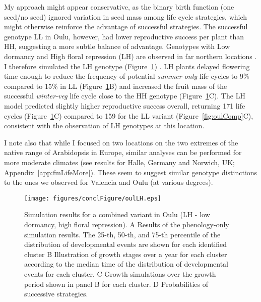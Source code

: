 My approach might appear conservative, as the binary birth function (one seed/no
seed) ignored variation in seed mass among life cycle strategies, which might
otherwise reinforce the advantage of successful strategies. The successful
genotype LL in Oulu, however, had lower reproductive success per plant than HH,
suggesting a more subtle balance of advantage. Genotypes with Low dormancy and
High floral repression (LH) are observed in far northern locations
\citep{atwell_genome-wide_2010}. I therefore simulated the LH genotype
(Figure~\ref{fig:oulLH}) . LH plants delayed flowering time enough to reduce the
frequency of potential \emph{summer-only} life cycles to 9\% compared to 15\% in
LL (Figure~\ref{fig:oulLH}B) and increased the fruit mass of the successful
\emph{winter-veg} life cycle close to the HH genotype
(Figure~\ref{fig:oulLH}C). The LH model predicted slightly higher reproductive
success overall, returning 171 life cycles (Figure~\ref{fig:oulLH}C) compared to
159 for the LL variant (Figure~\ref{fig:oulComp}C), consistent with the
observation of LH genotypes at this location.

I note also that while I focused on two locations on the two extremes of the
native range of Arabidopsis in Europe, similar analyses can be performed for
more moderate climates (see results for Halle, Germany and Norwich, UK;
Appendix~\ref{app:fmLifeMore}). These seem to suggest similar genotype
distinctions to the ones we observed for Valencia and Oulu (at various degrees).

\begin{figure}[tb]
\centering
\texttt{[image: figures/conclFigure/oulLH.eps]}
\caption{Simulation results for a combined variant in Oulu (LH - low dormancy,
  high floral repression). A Results of the phenology-only simulation
  results. The 25-th, 50-th, and 75-th percentile of the distribution of
  developmental events are shown for each identified cluster B Illustration of
  growth stages over a year for each cluster according to the median time of the
  distribution of developmental events for each cluster. C Growth simulations
  over the growth period shown in panel B for each cluster.  D Probabilities of
  successive strategies.}
\label{fig:oulLH}
\end{figure}

